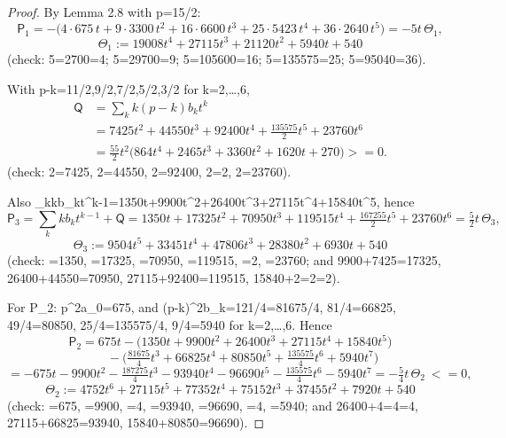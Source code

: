\documentclass[10pt,reqno]{amsart}
\def\({}\def\){}%
\def\frac#1#2{#1/#2}%
\def\ge{>=}\def\le{<=}%
\theoremstyle{definition}
\theoremstyle{remark}
\begin{document}
\begin{proof}
By Lemma 2.8 with \(p=\frac{15}2\): \[\mathsf P_1=-\big(4\cdot675\,t+9\cdot3300\,t^2+16\cdot6600\,t^3+25\cdot5423\,t^4
+36\cdot2640\,t^5\big)=-5t\,\Theta_1,\] \[\Theta_1:=19008t^4+27115t^3+21120t^2+5940t+540\] (check: \(5=2700=4\); \(5=29700=9\); \(5=105600=16\); \(5=135575=25\); \(5=95040=36\)).

With \(p-k=\frac{11}2,\frac92,\frac72,\frac52,\frac32\) for \(k=2,\dots,6\), \[
\begin{aligned}
\mathsf Q
 &=\sum_k k(p-k)b_kt^k\\
 &=7425t^2+44550t^3+92400t^4+\tfrac{135575}{2}t^5+23760t^6\\
 &=\tfrac{55}{2}t^2\bigl(864t^4+2465t^3+3360t^2+1620t+270\bigr)\ge0.
\end{aligned}
\] (check: \(2=7425\), \(2=44550\), \(2=92400\), \(2=2\), \(2=23760\)).

Also \(\sum_kkb_kt^{k-1}=1350t+9900t^2+26400t^3+27115t^4+15840t^5\), hence \[\mathsf P_3=\sum_kkb_kt^{k-1}+\mathsf Q
=1350t+17325t^2+70950t^3+119515t^4+\tfrac{167255}2t^5+23760t^6=\tfrac52t\,\Theta_3,\] \[\Theta_3:=9504t^5+33451t^4+47806t^3+28380t^2+6930t+540\] (check: \(=1350\), \(=17325\), \(=70950\), \(=119515\), \(=2\), \(=23760\); and \(9900+7425=17325\), \(26400+44550=70950\), \(27115+92400=119515\), \(15840+2=2=2\)).

For \(\mathsf P_2\): \(p^2a_0=675\), and \((p-k)^2b_k=\frac{121}4=\frac{81675}4\), \(\frac{81}4=66825\), \(\frac{49}4=80850\), \(\frac{25}4=\frac{135575}4\), \(\frac94=5940\) for \(k=2,\dots,6\). Hence \[\mathsf P_2=675t-\big(1350t+9900t^2+26400t^3+27115t^4+15840t^5\big)\] \[\qquad-\big(\tfrac{81675}4t^3+66825t^4+80850t^5+\tfrac{135575}4t^6+5940t^7\big)\] \[=-675t-9900t^2-\tfrac{187275}4t^3-93940t^4-96690t^5-\tfrac{135575}4t^6-5940t^7
=-\tfrac54t\,\Theta_2\ \le0,\] \[\Theta_2:=4752t^6+27115t^5+77352t^4+75152t^3+37455t^2+7920t+540\] (check: \(=675\), \(=9900\), \(=4\), \(=93940\), \(=96690\), \(=4\), \(=5940\); and \(26400+4=4=4\), \(27115+66825=93940\), \(15840+80850=96690\)).


\end{proof}
\end{document}
